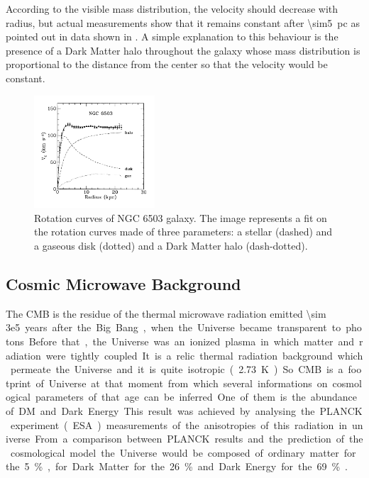 According to the visible mass distribution, the velocity should decrease with radius, but actual measurements show that it remains constant after \SI{\sim5}{pc} as pointed out in data shown in \Fig{\ref{fig:rotation}}. A simple explanation to this behaviour is the presence of a Dark Matter halo throughout the galaxy whose mass distribution is proportional to the distance from the center so that the velocity would be constant.
\begin{figure}[pt]
\centering
\includegraphics[width=0.4\textwidth]{DarkMatter/Rotationcurves}
\caption{Rotation curves of NGC 6503 galaxy. The image represents a fit on the rotation curves made of three parameters: a stellar (dashed) and a gaseous disk (dotted) and a Dark Matter halo (dash-dotted).}
\label{fig:rotation}
\end{figure}


\subsection{Cosmic Microwave Background}
The CMB is the residue of the thermal microwave radiation emitted \SI{\sim 3e5} years after the Big Bang, when the Universe became transparent to photons. Before that, the Universe was an ionized plasma in which matter and radiation were tightly coupled. It is a relic thermal radiation background which permeate the Universe and it is quite isotropic (\SI{2.73}{\K}). So CMB is a footprint of Universe at that moment from which several informations on cosmological parameters of that age can be inferred. One of them is the abundance of DM and Dark Energy. This result was achieved by analysing the PLANCK experiment (ESA) measurements of the anisotropies of this radiation in universe. From a comparison between PLANCK results and the prediction of the cosmological model the Universe would be composed of ordinary matter for the 5\%, for Dark Matter for the 26\% and Dark Energy for the 69\% \cite{Planck:results}.

